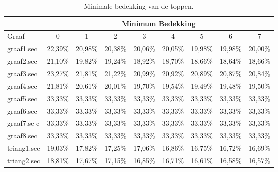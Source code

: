 \documentclass[11pt, a4paper, table]{article}
\theoremstyle{definition}
\theoremstyle{definition}
\theoremstyle{definition}
\begin{document}
\begin{table}
	\centering
	\begin{tabular}{|l|c|c|c|c|c|c|c|c|}
		\hline
		& \multicolumn{8}{c|}{Minimum Bedekking}		\\ \hline
		Graaf & 0  & 1  & 2  & 3  & 4  & 5  & 6  & 7 		\\ \hline
		graaf1.sec & 22,39\% & 20,98\% & 20,38\% & 20,06\% & 20,05\% &  \cellcolor{LimeGreen}19,98\% & 19,98\% & 20,00\%		\\ \hline
		graaf2.sec & 21,10\% & 19,82\% & 19,24\% & 18,92\% & 18,70\% & 18,66\% &  \cellcolor{LimeGreen}18,64\% & 18,66\%		\\ \hline
		graaf3.sec & 23,27\% & 21,81\% & 21,22\% & 20,99\% & 20,92\% & 20,89\% & 20,87\% &  \cellcolor{LimeGreen}20,84\%		\\ \hline
		graaf4.sec & 21,81\% & 20,61\% & 20,01\% & 19,70\% & 19,54\% & 19,49\% &  \cellcolor{LimeGreen}19,48\% & 19,50\%		\\ \hline
		graaf5.sec &  \cellcolor{LimeGreen}33,33\% & 33,33\% & 33,33\% & 33,33\% & 33,33\% & 33,33\% & 33,33\% & 33,33\%		\\ \hline
		graaf6.sec &  \cellcolor{LimeGreen}33,33\% & 33,33\% & 33,33\% & 33,33\% & 33,33\% & 33,33\% & 33,33\% & 33,33\%		\\ \hline
		graaf7.se c &  \cellcolor{LimeGreen}33,33\% & 33,33\% & 33,33\% & 33,33\% & 33,33\% & 33,33\% & 33,33\% & 33,33\%		\\ \hline
		graaf8.sec &  \cellcolor{LimeGreen}33,33\% & 33,33\% & 33,33\% & 33,33\% & 33,33\% & 33,33\% & 33,33\% & 33,33\%		\\ \hline
		triang1.sec & 19,03\% & 17,82\% & 17,25\% & 17,06\% & 16,86\% & 16,75\% & 16,72\% &  \cellcolor{LimeGreen}16,69\%		\\ \hline
		triang2.sec & 18,81\% & 17,67\% & 17,15\% & 16,85\% & 16,71\% & 16,61\% & 16,58\% &  \cellcolor{LimeGreen}16,57\%		\\ \hline
	\end{tabular}
	\caption{Minimale bedekking van de toppen.}
	\label{tabel:bedekking1}
\end{table}
\end{document}
